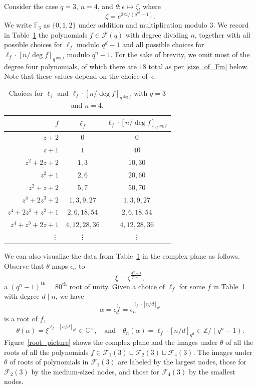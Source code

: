 \documentclass[Unicode,ALCO]{cedram}
\newcommand{\Cbb}{\mathbb{C}}
\newcommand{\F}{\mathbb{F}}
\newcommand{\CF}{\mathcal{F}}
\newcommand{\Z}{\mathbb{Z}}
\newcommand{\eps}{\epsilon}
\newcommand{\te}{\theta}
\begin{document}
\begin{example}
Consider the case \(q = 3\), \(n = 4\), and \(\te : \eps \mapsto \zeta\), where
\[\zeta = e^{2 \pi i / (q^{n!}-1)}.\]
We write \(\F_3\) as \(\{0,1,2\}\) under addition and multiplication modulo \(3\).
We record in Table~\ref{root_table} the polynomials \(f \in \CF (q)\) with degree dividing \(n\), together with all possible choices for \(\ell_f\) modulo \(q^d-1\) and all possible choices for \(\ell_f \cdot [n / \deg f]_{q^{\deg f}}\) modulo \(q^n-1\).
For the sake of brevity, we omit most of the degree four polynomials, of which there are \(18\) total as per \eqref{size_of_Fm} below.
Note that these values depend on the choice of~\(\eps\).
\begin{table}[ht]
\caption{Choices for \(\ell_f\) and \(\ell_f \cdot [n/\deg f]_{q^{\deg f}}\) with \(q = 3\) and \(n = 4\).}
\centering
\begin{tabular}{r|c|c}
\(f\) & \(\ell_f\) & \(\ell_f \cdot [n/\deg f]_{q^{\deg f}}\) \\ \hline \hline
\(z + 2\) &                  \( 0 \) & \(0\) \\
\(z + 1\) &                  \( 1 \) & \(40\) \\
\hline
\(z^2 + 2z + 2\) &           \( 1, 3 \) & \( 10, 30 \) \\
\(z^2 + 1\) &                \( 2, 6 \) & \( 20, 60 \) \\
\(z^2 + z + 2\) &            \( 5, 7 \) & \( 50, 70 \) \\
\hline
\(z^4 + 2z^3 + 2\) &         \( 1,  3,  9, 27 \) & \( 1,  3,  9, 27 \) \\
\(z^4 + 2z^3 + z^2 + 1\) &   \( 2,  6, 18, 54 \) & \( 2,  6, 18, 54 \) \\
\(z^4 + z^3 + 2z + 1\) &     \( 4, 12, 28, 36 \) & \( 4, 12, 28, 36 \) \\
\vdots & \vdots & \vdots
\end{tabular}
\label{root_table}
\end{table}

We can also visualize the data from Table~\ref{root_table} in the complex plane as follows.
Observe that \(\te\) maps \(\eps_n\) to
\[
\xi = \zeta^{\frac{q^{n!}-1}{q^n-1}},
\]
a \((q^n-1)^\text{th} = 80^\text{th}\) root of unity.
Given a choice of \(\ell_f\) for some \(f\) in Table~\ref{root_table} with degree \(d \mid n\), we have
\[
\alpha
=
\eps_d^{\ell_f}
=
\eps_n^{\ell_f \cdot [n/d]_{q^d}}
\]
is a root of \(f\),
\[
\te (\alpha) = \xi^{\ell_f \cdot [n/d]_{q^d}} \in \Cbb^\times,
\quad
\text{and}
\quad
\te_n (\alpha) = \ell_f \cdot [n/d]_{q^d} \in \Z / (q^n-1).
\]
Figure~\ref{root_picture} shows the complex plane and the images under \(\te\) of all the roots of all the polynomials \(f \in \CF_1 (3) \sqcup \CF_2 (3) \sqcup \CF_4 (3)\).
The images under \(\te\) of roots of polynomials in \(\CF_1 (3)\) are labeled by the largest nodes, those for \(\CF_2 (3)\) by the medium-sized nodes, and those for \(\CF_4 (3)\) by the smallest nodes.


\end{example}
\end{document}
